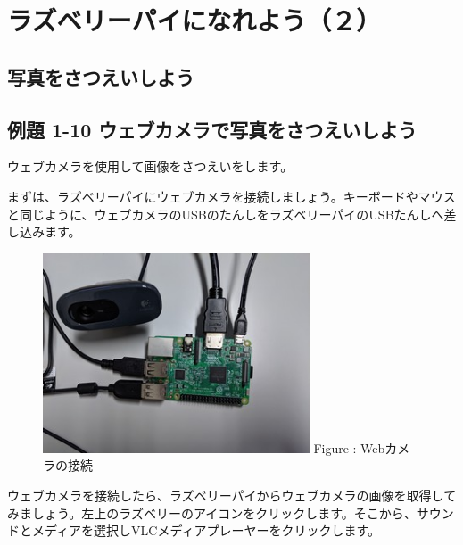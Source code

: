 \documentclass[a4paper,12pt]{jarticle}
\begin{document}
\section[ラズベリーパイになれよう（２）]{ラズベリーパイになれよう（２）}
\subsection{写真をさつえいしよう}
\subsection{例題 1-10
  ウェブカメラで写真をさつえいしよう}
ウェブカメラを使用して画像をさつえいをします。

まずは、ラズベリーパイにウェブカメラを接続しましょう。キーボードやマウスと同じように、ウェブカメラのUSBのたんしをラズベリーパイのUSBたんしへ差し込みます。



\begin{figure}[ht]
  \centering
  \begin{minipage}{8.528cm}
    {\upshape
      \includegraphics[width=7.904cm,height=5.928cm]{textbook-img112.jpg}
      \newline
      Figure : Webカメラの接続}
  \end{minipage}
\end{figure}
ウェブカメラを接続したら、ラズベリーパイからウェブカメラの画像を取得してみましょう。左上のラズベリーのアイコンをクリックします。そこから、サウンドとメディアを選択しVLCメディアプレーヤーをクリックします。
\end{document}
